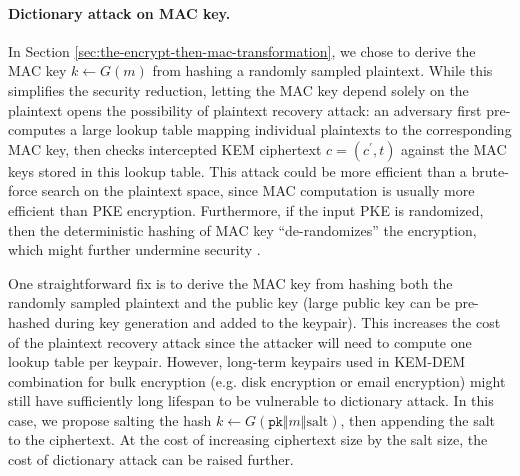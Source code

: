 \documentclass[runningheads]{llncs}
\newcommand{\pk}{\texttt{pk}}
\begin{document}
\paragraph{Dictionary attack on MAC key.} In Section \ref{sec:the-encrypt-then-mac-transformation}, we chose to derive the MAC key $k \leftarrow G(m)$ from hashing a randomly sampled plaintext. While this simplifies the security reduction, letting the MAC key depend solely on the plaintext opens the possibility of plaintext recovery attack: an adversary first pre-computes a large lookup table mapping individual plaintexts to the corresponding MAC key, then checks intercepted KEM ciphertext $c = (c^\prime, t)$ against the MAC keys stored in this lookup table. This attack could be more efficient than a brute-force search on the plaintext space, since MAC computation is usually more efficient than PKE encryption. Furthermore, if the input PKE is randomized, then the deterministic hashing of MAC key ``de-randomizes'' the encryption, which might further undermine security \cite{cryptoeprint:2021/912}.

One straightforward fix is to derive the MAC key from hashing both the randomly sampled plaintext and the public key (large public key can be pre-hashed during key generation and added to the keypair). This increases the cost of the plaintext recovery attack since the attacker will need to compute one lookup table per keypair. However, long-term keypairs used in KEM-DEM combination for bulk encryption (e.g. disk encryption or email encryption) might still have sufficiently long lifespan to be vulnerable to dictionary attack. In this case, we propose salting the hash $k \leftarrow G(\pk \Vert m \Vert \text{salt})$, then appending the salt to the ciphertext. At the cost of increasing ciphertext size by the salt size, the cost of dictionary attack can be raised further.
\end{document}
